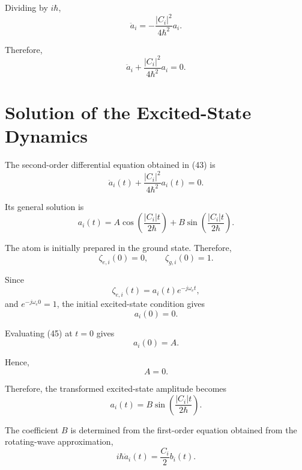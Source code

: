 \documentclass[12pt,a4paper]{article}
\begin{document}
Dividing by \(i\hbar\),
\[
\ddot a_i
=
-\frac{|C_i|^2}{4\hbar^2}a_i.
\]

Therefore,
\begin{equation}
\boxed{
\ddot a_i
+
\frac{|C_i|^2}{4\hbar^2}a_i
=
0.
}
\tag{43}
\end{equation}

\section{Solution of the Excited-State Dynamics}

The second-order differential equation obtained in (43) is
\begin{equation}
\ddot{a}_i(t)
+
\frac{|C_i|^2}{4\hbar^2}a_i(t)
=0.
\tag{44}
\end{equation}

Its general solution is
\begin{equation}
a_i(t)
=
A\cos\left(\frac{|C_i|t}{2\hbar}\right)
+
B\sin\left(\frac{|C_i|t}{2\hbar}\right).
\tag{45}
\end{equation}

The atom is initially prepared in the ground state. Therefore,
\begin{equation}
\zeta_{e,i}(0)=0,
\qquad
\zeta_{g,i}(0)=1.
\tag{46}
\end{equation}

Since
\begin{equation}
\zeta_{e,i}(t)=a_i(t)e^{-j\omega_e t},
\tag{47}
\end{equation}
and $e^{-j\omega_e 0}=1$, the initial excited-state condition gives
\begin{equation}
a_i(0)=0.
\tag{48}
\end{equation}

Evaluating (45) at $t=0$ gives
\begin{equation}
a_i(0)=A.
\tag{49}
\end{equation}

Hence,
\begin{equation}
A=0.
\tag{50}
\end{equation}

Therefore, the transformed excited-state amplitude becomes
\begin{equation}
a_i(t)
=
B\sin\left(\frac{|C_i|t}{2\hbar}\right).
\tag{51}
\end{equation}

The coefficient $B$ is determined from the first-order equation
obtained from the rotating-wave approximation,
\begin{equation}
i\hbar\dot a_i(t)=\frac{C_i}{2}b_i(t).
\tag{52}
\end{equation}
\end{document}
